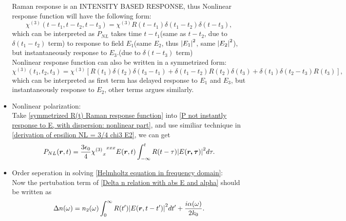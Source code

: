 \documentclass[12pt]{extarticle}
\numberwithin{equation}{section}
\numberwithin{figure}{section}
\numberwithin{table}{section}
\newcommand{\<}{\langle}
\renewcommand{\>}{\rangle}
\theoremstyle{definition}
\newcommand{\chiThree}{{{\chi^{(3)}}_x}^{xxx}}
\begin{document}
\begin{itemize}
                Raman response is an \MakeUppercase{intensity based response}, thus Nonlinear response function will have the following form:
                \begin{equation}
                    \chi^{(3)}(t-t_1,t-t_2,t-t_3)=\chi^{(3)}R(t-t_1)\delta(t_1-t_2)\delta(t-t_3),
                    \label{unsymmetrized R(t) Raman response function}
                \end{equation}
                which can be interpreted as $P_{NL}$ takes time $t-t_1$(same as $t-t_2$, due to $\delta(t_1-t_2)$ term) to response to field $E_1$(same $E_2$, thus $\abs{E_1}^2$, same $\abs{E_2}^2$), but instantaneously response to $E_3$.(due to $\delta(t-t_3)$ term)\\
                Nonlinear response function can also be written in a symmetrized form:
                \begin{equation}
                    \chi^{(3)}(t_1,t_2,t_3)=\chi^{(3)}[R(t_1)\delta(t_2)\delta(t_3-t_1)+\delta(t_1-t_2)R(t_2)\delta(t_3)+\delta(t_1)\delta(t_2-t_3)R(t_3)],
                    \label{symmetrized R(t) Raman response function}
                \end{equation}
                which can be interpreted as first term has delayed response to $E_1$ and $E_3$, but instantaneously response to $E_2$, other terms argues similarly.
            \item Nonlinear polarization:\\
                Take \autoref{symmetrized R(t) Raman response function} into \autoref{P not instantly response to E, with dispersion: nonlinear part}, and use similiar technique in \autoref{derivation of epsilion NL = 3/4 chi3 E2}, we can get
                \begin{equation}
                    P_{NL}(\boldsymbol{r},t)=\frac{3\epsilon_0}{4}\chiThree E(\boldsymbol{r},t)\int_{-\infty}^t R(t-\tau)\abs{E(\boldsymbol{r,\tau})}^2 d\tau.
                \end{equation}
            \item Order seperation in solving \autoref{Helmholtz equation in frequency domain}:\\
                Now the pertubation term of \autoref{Delta n relation with abs E and alpha} should be written as
                \begin{equation}
                    \Delta n(\omega) = n_2(\omega)\int_0^\infty R(t^\prime)\abs{E(\boldsymbol{r},t-t^\prime)}^2dt^\prime+\frac{i\alpha(\omega)}{2k_0}.
                    \label{Delta n relation with abs E and alpha: with Raman term, in intergral of R(t)}

\end{equation}
\end{itemize}
\end{document}
